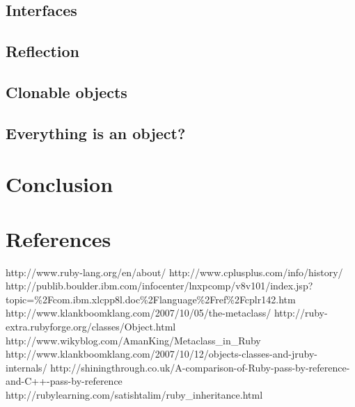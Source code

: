 \documentclass[10pt,a4paper,twocolumn]{article}
\begin{document}
\subsection{Interfaces}

\subsection{Reflection}

\subsection{Clonable objects}

\subsection{Everything is an object?}

\section{Conclusion}

\section{References}
http://www.ruby-lang.org/en/about/
http://www.cplusplus.com/info/history/
http://publib.boulder.ibm.com/infocenter/lnxpcomp/v8v101/index.jsp?topic=\%2Fcom.ibm.xlcpp8l.doc\%2Flanguage\%2Fref\%2Fcplr142.htm
http://www.klankboomklang.com/2007/10/05/the-metaclass/
http://ruby-extra.rubyforge.org/classes/Object.html
http://www.wikyblog.com/AmanKing/Metaclass_in_Ruby
http://www.klankboomklang.com/2007/10/12/objects-classes-and-jruby-internals/
http://shiningthrough.co.uk/A-comparison-of-Ruby-pass-by-reference-and-C++-pass-by-reference
http://rubylearning.com/satishtalim/ruby_inheritance.html
\end{document}
